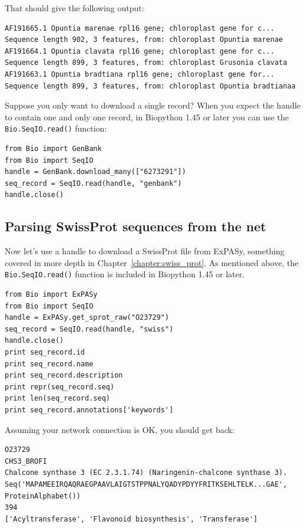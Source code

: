 \documentclass{report}
\begin{document}
\noindent That should give the following output:

\begin{verbatim}
AF191665.1 Opuntia marenae rpl16 gene; chloroplast gene for c...
Sequence length 902, 3 features, from: chloroplast Opuntia marenae
AF191664.1 Opuntia clavata rpl16 gene; chloroplast gene for c...
Sequence length 899, 3 features, from: chloroplast Grusonia clavata
AF191663.1 Opuntia bradtiana rpl16 gene; chloroplast gene for...
Sequence length 899, 3 features, from: chloroplast Opuntia bradtianaa
\end{verbatim}

Suppose you only want to download a single record?  When you expect the handle to contain one and only one record, in Biopython 1.45 or later you can use the \verb|Bio.SeqIO.read()| function:

\begin{verbatim}
from Bio import GenBank
from Bio import SeqIO
handle = GenBank.download_many(["6273291"])
seq_record = SeqIO.read(handle, "genbank")
handle.close()
\end{verbatim}

\subsection{Parsing SwissProt sequences from the net}
\label{sec:SeqIO_ExPASy_and_SwissProt}

Now let's use a handle to download a SwissProt file from ExPASy, something covered in more depth in Chapter~\ref{chapter:swiss_prot}.
As mentioned above, the \verb|Bio.SeqIO.read()| function is included in Biopython 1.45 or later.

\begin{verbatim}
from Bio import ExPASy
from Bio import SeqIO
handle = ExPASy.get_sprot_raw("O23729")
seq_record = SeqIO.read(handle, "swiss")
handle.close()
print seq_record.id
print seq_record.name
print seq_record.description
print repr(seq_record.seq)
print len(seq_record.seq)
print seq_record.annotations['keywords']
\end{verbatim}

\noindent Assuming your network connection is OK, you should get back:

\begin{verbatim}
O23729
CHS3_BROFI
Chalcone synthase 3 (EC 2.3.1.74) (Naringenin-chalcone synthase 3).
Seq('MAPAMEEIRQAQRAEGPAAVLAIGTSTPPNALYQADYPDYYFRITKSEHLTELK...GAE', ProteinAlphabet())
394
['Acyltransferase', 'Flavonoid biosynthesis', 'Transferase']
\end{verbatim}
\end{document}
